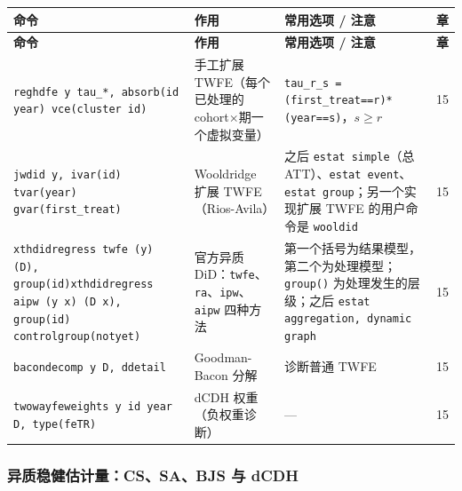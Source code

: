 {\renewcommand{\arraystretch}{1.12}\begin{longtable}{@{}>{\raggedright\arraybackslash\small}p{5.3cm}>{\raggedright\arraybackslash\small}p{3.8cm}>{\raggedright\arraybackslash\small}p{5.3cm}>{\centering\arraybackslash\small}p{0.9cm}@{}}
\toprule
\textbf{命令} & \textbf{作用} & \textbf{常用选项 / 注意} & \textbf{章}\\
\midrule
\endfirsthead
\toprule
\textbf{命令} & \textbf{作用} & \textbf{常用选项 / 注意} & \textbf{章}\\
\midrule
\endhead
\bottomrule
\endlastfoot

\texttt{reghdfe y tau\_*, absorb(id year) vce(cluster id)} & 手工扩展 TWFE（每个已处理的 cohort$\times$期一个虚拟变量） & \texttt{tau\_r\_s = (first\_treat==r)*(year==s)}，$s\ge r$ & 15\\
\addlinespace[1pt]
\texttt{jwdid y, ivar(id) tvar(year) gvar(first\_treat)}\newline {\footnotesize\rmfamily [SSC]} & Wooldridge 扩展 TWFE（Rios-Avila） & 之后 \texttt{estat simple}（总 ATT）、\texttt{estat event}、\texttt{estat group}；另一个实现扩展 TWFE 的用户命令是 \texttt{wooldid} & 15\\
\addlinespace[1pt]
\texttt{xthdidregress twfe (y) (D), group(id)}\newline \texttt{xthdidregress aipw (y x) (D x), group(id) controlgroup(notyet)}\newline {\footnotesize\rmfamily [官方，Stata 18 起]} & 官方异质 DiD：\texttt{twfe}、\texttt{ra}、\texttt{ipw}、\texttt{aipw} 四种方法 & 第一个括号为结果模型，第二个为处理模型；\texttt{group()} 为处理发生的层级；之后 \texttt{estat aggregation, dynamic graph} & 15\\
\addlinespace[1pt]
\texttt{bacondecomp y D, ddetail}\newline {\footnotesize\rmfamily [SSC]} & Goodman-Bacon 分解 & 诊断普通 TWFE & 15\\
\addlinespace[1pt]
\texttt{twowayfeweights y id year D, type(feTR)}\newline {\footnotesize\rmfamily [SSC]} & dCDH 权重（负权重诊断） & — & 15\\
\end{longtable}}


\subsubsection{异质稳健估计量：CS、SA、BJS 与 dCDH}

